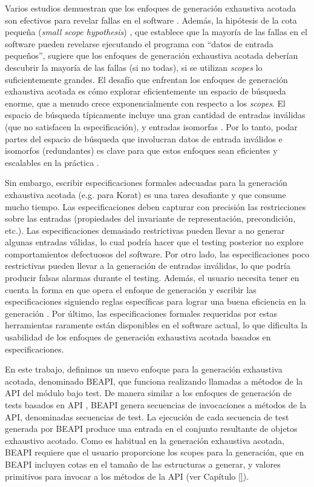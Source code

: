 Varios estudios demuestran que los enfoques de generación exhaustiva acotada son
efectivos para revelar fallas en el software \cite{Marinov01, Khurshid01,
Boyapati02, Sullivan04}. Además, la hipótesis de la cota pequeña (\textit{small
scope hypothesis}) \cite{Andoni02}, que establece que la mayoría de las fallas
en el software pueden revelarse ejecutando el programa con ``datos de entrada
pequeños'', sugiere que los enfoques de generación exhaustiva acotada deberían
descubrir la mayoría de las fallas (si no todas), si se utilizan \textit{scopes}
lo suficientemente grandes. El desafío que enfrentan los enfoques de generación
exhaustiva acotada es cómo explorar eficientemente un espacio de búsqueda
enorme, que a menudo crece exponencialmente con respecto a los \textit{scopes}.
El espacio de búsqueda típicamente incluye una gran cantidad de entradas
inválidas (que no satisfacen la especificación), y entradas isomorfas \cite{15, 28} . 
Por lo tanto, podar partes del espacio de búsqueda que involucran datos de entrada 
inválidos e isomorfos (redundantes) es clave para que estos enfoques sean eficientes y 
escalables en la práctica \cite{Boyapati02}.

Sin embargo, escribir especificaciones formales adecuadas para la generación
exhaustiva acotada (e.g. para Korat) es una tarea desafiante y que consume mucho tiempo. Las
especificaciones deben capturar con precisión las restricciones sobre las
entradas (propiedades del invariante de representación, precondición, etc.). 
Las especificaciones demasiado restrictivas pueden llevar a no generar
algunas entradas válidas, lo cual podría hacer que el testing posterior no explore 
comportamientos defectuosos del software. Por otro lado, las especificaciones
poco restrictivas pueden llevar a la generación de entradas inválidas, lo que
podría producir falsas alarmas durante el testing. Además, el usuario necesita 
tener en cuenta la forma en que opera el enfoque de generación y escribir las especificaciones 
siguiendo reglas específicas para lograr una buena eficiencia en la generación \cite{Boyapati02}. 
Por último, las especificaciones formales requeridas por estas herramientas raramente están disponibles 
en el software actual, lo que dificulta la usabilidad de los enfoques de generación exhaustiva 
acotada basados en especificaciones.

En este trabajo, definimos un nuevo enfoque para la generación exhaustiva
acotada, denominado BEAPI, que funciona realizando llamadas a métodos de la API
del módulo bajo test. De manera similar a los enfoques de generación de tests basados en API \cite{Pacheco07, Ma15,Fraser11}, BEAPI genera secuencias de invocaciones a métodos de la API, denominadas secuencias de test. 
La ejecución de cada secuencia de test generada por BEAPI produce una entrada en el conjunto resultante de objetos exhaustivo acotado. 
Como es habitual en la generación exhaustiva acotada, BEAPI requiere que el
usuario proporcione los scopes para la generación, que en BEAPI incluyen cotas
en el tamaño de las estructuras a generar, y valores primitivos para invocar a
los métodos de la API (ver Capítulo \ref{}). 

